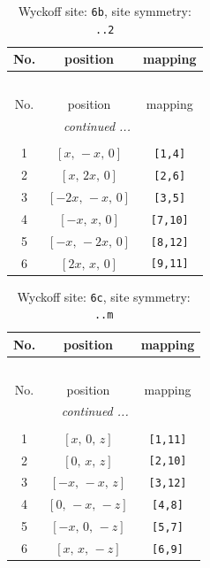\documentclass[fleqn,8pt]{jsarticle}
\begin{document}
\begin{longtable}{ccc}
\caption{Wyckoff site: {\tt 6b}, site symmetry: {\tt ..2}}
 \\
 \hline \hline
No. & position & mapping \\ \hline \endfirsthead

\multicolumn{2}{l}{\tablename\ \thetable{}} \\
 \hline \hline
No. & position & mapping \\ \hline \endhead

 \hline \hline
\multicolumn{2}{r}{\footnotesize\it continued ...} \\ \endfoot

 \hline \hline
\multicolumn{2}{r}{} \\ \endlastfoot

1 & $\left[ x,\, - x,\, 0 \right]$ & {\tt [1,4]} \\ \hline
2 & $\left[ x,\, 2 x,\, 0 \right]$ & {\tt [2,6]} \\ \hline
3 & $\left[ - 2 x,\, - x,\, 0 \right]$ & {\tt [3,5]} \\ \hline
4 & $\left[ - x,\, x,\, 0 \right]$ & {\tt [7,10]} \\ \hline
5 & $\left[ - x,\, - 2 x,\, 0 \right]$ & {\tt [8,12]} \\ \hline
6 & $\left[ 2 x,\, x,\, 0 \right]$ & {\tt [9,11]} \\
\end{longtable}
\renewcommand{\arraystretch}{1.2}
\begin{longtable}{ccc}
\caption{Wyckoff site: {\tt 6c}, site symmetry: {\tt ..m}}
 \\
 \hline \hline
No. & position & mapping \\ \hline \endfirsthead

\multicolumn{2}{l}{\tablename\ \thetable{}} \\
 \hline \hline
No. & position & mapping \\ \hline \endhead

 \hline \hline
\multicolumn{2}{r}{\footnotesize\it continued ...} \\ \endfoot

 \hline \hline
\multicolumn{2}{r}{} \\ \endlastfoot

1 & $\left[ x,\, 0,\, z \right]$ & {\tt [1,11]} \\ \hline
2 & $\left[ 0,\, x,\, z \right]$ & {\tt [2,10]} \\ \hline
3 & $\left[ - x,\, - x,\, z \right]$ & {\tt [3,12]} \\ \hline
4 & $\left[ 0,\, - x,\, - z \right]$ & {\tt [4,8]} \\ \hline
5 & $\left[ - x,\, 0,\, - z \right]$ & {\tt [5,7]} \\ \hline
6 & $\left[ x,\, x,\, - z \right]$ & {\tt [6,9]} \\
\end{longtable}
\end{document}
